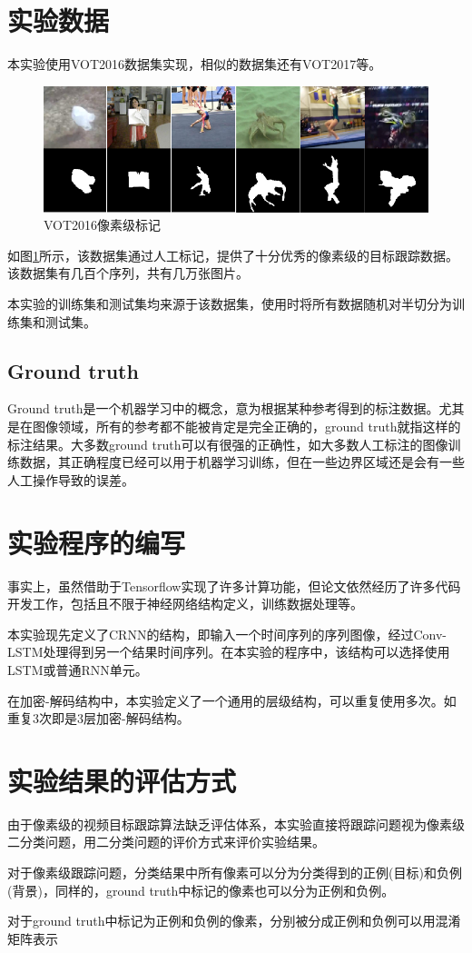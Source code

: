 \section{实验数据}
本实验使用VOT2016数据集\supercite{Vojir-TR-2017-01}实现，相似的数据集还有VOT2017等。
\par
\begin{figure}[htbp!]
    \centering
    \includegraphics[width = 1.\textwidth]{chap/img/vot_2016_pixel.png}
    \caption{VOT2016像素级标记}\label{fig:vot_2016_pixel}
\end{figure}
\par
如图\ref{fig:vot_2016_pixel}所示，该数据集通过人工标记，提供了十分优秀的像素级的目标跟踪数据。该数据集有几百个序列，共有几万张图片。
\par
本实验的训练集和测试集均来源于该数据集，使用时将所有数据随机对半切分为训练集和测试集。
\subsection{Ground truth}
Ground truth是一个机器学习中的概念，意为根据某种参考得到的标注数据。尤其是在图像领域，所有的参考都不能被肯定是完全正确的，ground truth就指这样的标注结果。大多数ground truth可以有很强的正确性，如大多数人工标注的图像训练数据，其正确程度已经可以用于机器学习训练，但在一些边界区域还是会有一些人工操作导致的误差。

\section{实验程序的编写}
事实上，虽然借助于Tensorflow实现了许多计算功能，但论文依然经历了许多代码开发工作，包括且不限于神经网络结构定义，训练数据处理等。
\par
本实验现先定义了CRNN的结构，即输入一个时间序列的序列图像，经过Conv-LSTM处理得到另一个结果时间序列。在本实验的程序中，该结构可以选择使用LSTM或普通RNN单元。
\par
在加密-解码结构中，本实验定义了一个通用的层级结构，可以重复使用多次。如重复3次即是3层加密-解码结构。

\section{实验结果的评估方式}
由于像素级的视频目标跟踪算法缺乏评估体系，本实验直接将跟踪问题视为像素级二分类问题，用二分类问题的评价方式来评价实验结果。
\par
对于像素级跟踪问题，分类结果中所有像素可以分为分类得到的正例(目标)和负例(背景)，同样的，ground truth中标记的像素也可以分为正例和负例。
\par
对于ground truth中标记为正例和负例的像素，分别被分成正例和负例可以用混淆矩阵表示
